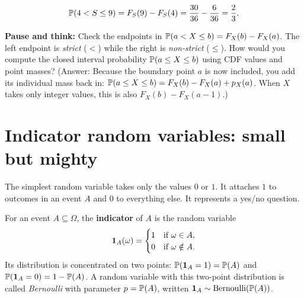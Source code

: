 \[
  \P(4 < S \le 9) = F_S(9) - F_S(4) = \frac{30}{36} - \frac{6}{36} = \frac{2}{3}.
\]

\begin{walkbox}
\textbf{Pause and think:} Check the endpoints in $\P(a < X \le b) = F_X(b) - F_X(a)$.
The left endpoint is \emph{strict} ($<$) while the right is \emph{non-strict} ($\le$).
How would you compute the closed interval probability $\P(a \le X \le b)$ using CDF values and point masses?
(Answer: Because the boundary point $a$ is now included, you add its individual mass back in:
$\P(a \le X \le b) = F_X(b) - F_X(a) + p_X(a)$. When $X$ takes only integer values, this is also
$F_X(b) - F_X(a - 1)$.)
\end{walkbox}

\section{Indicator random variables: small but mighty}
\label{ch06:indicators}

The simplest random variable takes only the values $0$ or $1$. It attaches $1$ to outcomes in an event $A$ and $0$ to everything else. It represents a yes/no question.

\begin{definition}
\label{ch06:def-indicator}
For an event $A \subseteq \Omega$, the \textbf{indicator} of $A$ is the random variable
\[
  \ind_A(\omega) =
  \begin{cases}
    1 & \text{if } \omega \in A, \\
    0 & \text{if } \omega \notin A.
  \end{cases}
\]
Its distribution is concentrated on two points: $\P(\ind_A = 1) = \P(A)$ and
$\P(\ind_A = 0) = 1 - \P(A)$. A random variable with this two-point distribution is
called \emph{Bernoulli} with parameter $p = \P(A)$, written $\ind_A \sim \Bern(\P(A))$.
\end{definition}

